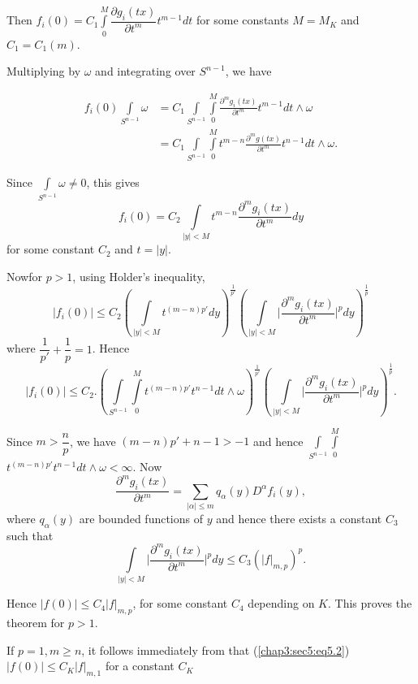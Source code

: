 Then $f_i (0) = C_1 \int\limits_{0}^M \dfrac{\partial g_i
  (tx)}{\partial t^m} t^{m-1} dt $ for some constants $M = M_K$ and
$C_1 = C_1 (m)$. 

Multiplying by $\omega$ and integrating over $S^{n-1}$, we have 

\begin{align*}
  f_i (0) \int\limits_{S^{n-1}} \omega &= C_1 \int\limits_{S^{n-1}}
  \int\limits_{0}^M \frac{\partial^m g_i (tx)}{\partial t^m} t^{m-1}
  dt \wedge \omega\\ 
  & = C_1 \int\limits_{S^{n-1}} \int\limits_0^M t^{m-n}
  \frac{\partial^m g(tx)}{\partial t^m} t^{n-1} dt \wedge \omega. 
\end{align*} 
 
Since $\int\limits_{S^{n-1}} \omega \neq 0$, this gives 
\begin{equation}
  f_i (0) = C_2 \int\limits_{| y | < M} t^{m-n} \frac{\partial^m g_i
    (tx)}{\partial t^m} dy \tag{5.2}\label{chap3:sec5:eq5.2} 
\end{equation}
for some constant $C_2$ and $t = | y |$.

Now\pageoriginale for $p > 1$, using Holder's inequality,
$$
| f_i (0) | \le C_2 \left(\int\limits_{| y | < M} t^{(m-n)p'}
dy\right)^{\frac{1}{p'}} \left( \int\limits_{| y | < M} \big | \frac{\partial^m
  g_i (tx)}{\partial t^m} \big |^p dy\right)^{\frac{1}{p}} 
$$
where $\dfrac{1}{p'} + \dfrac{1}{p} = 1$. Hence 
$$
| f_i (0) | \le C_2. \left( \int\limits_{S^{n-1}} \int\limits_0^M t^{(m-n)
  p'} t^{n-1} dt \wedge \omega\right)^{\frac{1}{p'}} \left( \int\limits_{|  y | <
  M} \big | \frac{\partial^m g_i (tx)}{\partial t^m} \big |^p
dy\right)^{\frac{1}{p}}. 
$$

Since $m > \dfrac{n}{p}$, we have $(m- n) p' + n- 1 > -1$ and hence
$\int\limits_{S^{n-1}} \int\limits_0^M$ $t^{(m - n)p'} t^{n-1} dt \wedge
\omega < \infty$. Now 
$$
 \frac{\partial^m g_i (tx)}{\partial t^m} =\sum_{| \alpha | \le m}
 q_\alpha (y) D^\alpha f_i (y), 
$$
where $q_\alpha (y)$ are bounded functions of $y$ and hence there
exists a constant $C_3$ such that 
$$
\int\limits_{| y | < M} \big | \frac{\partial^m g_i (tx)}{\partial
  t^m} \big |^p dy \leq C_3 (|f |_{m, p})^p. 
$$

Hence $| f (0)| \le C_4 | f|_{m, p}$, for some constant $C_4$ depending
on $K$. This proves the theorem for $ p > 1$. 

If $p = 1, m \ge n$, it follows immediately from that
(\ref{chap3:sec5:eq5.2}) $| f(0) | \le C_K | f|_{m, 1}$ for a constant $C_K$ 

